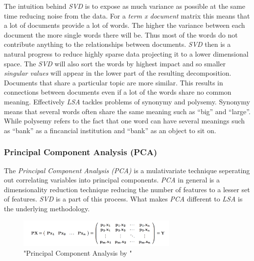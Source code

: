       The intuition behind \emph{SVD} is to expose as much variance as possible at the same time reducing noise from the data. For a \emph{term x document} matrix this means that a lot of documents provide a lot of words. The higher the variance between each document the more single words there will be. Thus most of the words do not contribute anything to the relationships between documents. \emph{SVD} then is a natural progress to reduce highly sparse data projecting it to a lower dimensional space. The \emph{SVD} will also sort the words by highest impact and so smaller \emph{singular values} will appear in the lower part of the resulting decomposition.\\
      Documents that share a particular topic are more similar. This results in connections between documents even if a lot of the words share no common meaning. Effectively \emph{LSA} tackles problems of synonymy and polysemy. Synonymy means that several words often share the same meaning such as ``big'' and ``large''. While polysemy refers to the fact that one word can have several meanings such as ``bank'' as a fincancial institution and ``bank'' as an object to sit on.

    \subsubsection{Principal Component Analysis (PCA)}
    The \emph{Principal Component Analysis (PCA)} is a mulativariate technique seperating out correlating variables into principal components. \emph{PCA} in general is a dimensionality reduction technique reducing the number of features to a lesser set of features. \emph{SVD} is a part of this process. What makes \emph{PCA} different to \emph{LSA} is the underlying methodology.

    \begin{figure}[h!]
      \centering
        \includegraphics[width=0.7\textwidth]{PCA.png}
        \caption{"Principal Component Analysis by \cite{PCA2009}"}
        \label{pca}
    \end{figure}

